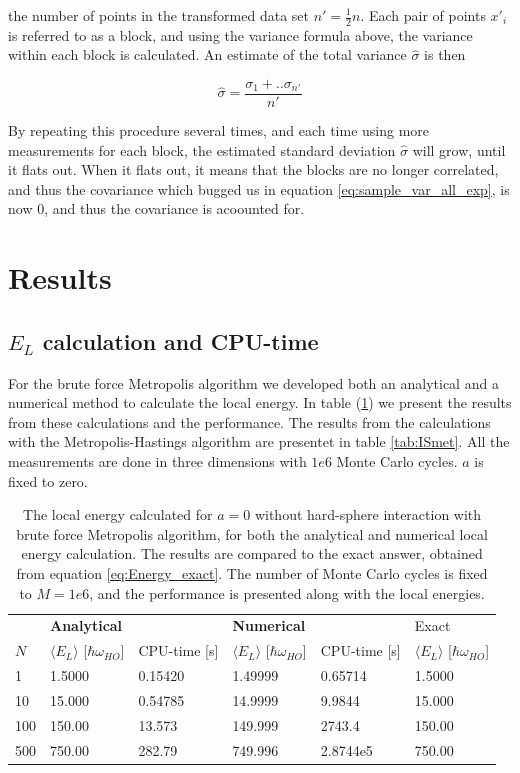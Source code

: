 \documentclass[norsk,a4paper,12pt]{article}
\begin{document}
 the number of points in the transformed data set $n' = \frac{1}{2} n$. Each pair of points $x'_i$ is referred to as a block, and using the variance formula above, the variance within each block is calculated. An estimate of the total variance $\hat{\sigma}$ is then
 
 \begin{equation}
 \hat{\sigma} = \frac{\sigma_1 + .. \sigma_{n'}}{n'}
 \end{equation}
 
By repeating this procedure several times, and each time using more measurements for each block, the estimated standard deviation $\hat{\sigma}$ will grow, until it flats out. When it flats out, it means that the blocks are no longer correlated, and thus the covariance which bugged us in equation \ref{eq:sample_var_all_exp}, is now 0, and thus the covariance is acoounted for.

\section{Results} \label{Results}

\subsection{$E_L$ calculation and CPU-time}\label{CPU}
For the brute force Metropolis algorithm we developed both an analytical and a numerical method to calculate the local energy. In table (\ref{tab:BFmet}) we present the results from these calculations and the performance. The results from the calculations with the Metropolis-Hastings algorithm are presentet in table \ref{tab:ISmet}. All the measurements are done in three dimensions with $1e6$ Monte Carlo cycles. $a$ is fixed to zero.

\begin{table} [H]
	\centering
	\caption{The local energy calculated for $a=0$  without hard-sphere interaction with brute force Metropolis algorithm, for both the analytical and numerical local energy calculation. The results are compared to the exact answer, obtained from equation \ref{eq:Energy_exact}. The number of Monte Carlo cycles is fixed to $M=1e6$, and the performance is presented along with the local energies. }
	\begin{tabularx}{\textwidth}{X|XX|XX|X} \hline
		\label{tab:BFmet}
		& \multicolumn{2}{X}{\textbf{Analytical}} & \multicolumn{2}{X}{\textbf{Numerical}} & Exact \\
		$N$ & $\langle E_L\rangle$ [$\hbar\omega_{HO}$] & CPU-time [s] & $\langle E_L\rangle$ [$\hbar\omega_{HO}$] & CPU-time [s]& $\langle E_L\rangle$ [$\hbar\omega_{HO}$]\\ \hline
		1 & 1.5000 & 0.15420 & 1.49999 & 0.65714 & 1.5000\\
		10 & 15.000 & 0.54785 & 14.9999 & 9.9844 & 15.000\\
		100 & 150.00 & 13.573 & 149.999 & 2743.4 & 150.00\\
		500 & 750.00 & 282.79 & 749.996 & 2.8744e5 & 750.00\\ \hline
	\end{tabularx}
\end{table}
\end{document}
